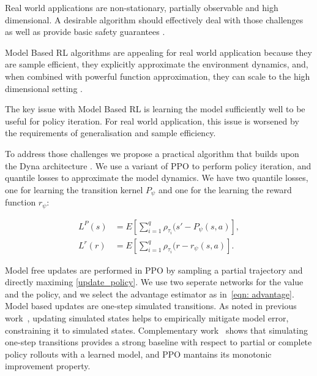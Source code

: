 \documentclass{article}
\begin{document}
        Real world applications are non-stationary, partially observable and high dimensional. A desirable algorithm should effectively deal with those challenges as well as provide basic safety guarantees \cite{dulac2019challenges}.
        
        Model Based RL algorithms are appealing for real world application because they are sample efficient, they explicitly approximate the environment dynamics, and, when combined with powerful function approximation, they can scale to the high dimensional setting \cite{nagabandi2018neural}.
        
        The key issue with Model Based RL is learning the model sufficiently well to be useful for policy iteration. For real world application, this issue is worsened by the requirements of generalisation and sample efficiency.
        
        To address those challenges we propose a practical algorithm that builds upon the Dyna architecture \cite{sutton2012dyna}.
        We use a variant of PPO \cite{Schulman2017} to perform policy iteration, and quantile losses to approximate the model dynamics. We have two quantile losses, one for learning the transition kernel $P_\psi$ and one for the learning the reward function $r_\psi$:

        
        \begin{align}
        	L^P(s) &= E[\sum_{i=1}^q \rho_{\tau_i}(s' - P_\psi(s,a)], \\
        	L^r(r) &= E[\sum_{i=1}^q \rho_{\tau_i}(r - r_\psi(s,a)].
        \end{align}
        
        Model free updates are performed in PPO by sampling a partial trajectory and directly maximing {\eqref{update_policy}}. %
        We use two seperate networks for the value and the policy, and we select the advantage estimator as in~\eqref{eqn: advantage}. Model based updates are one-step simulated transitions. As noted in previous work~\cite{van2019use}, updating simulated states helps to empirically mitigate model error, constraining it to simulated states. Complementary work~\cite{janner2019trust} shows that simulating one-step transitions provides a strong baseline with respect to partial or complete policy rollouts with a learned model, and PPO mantains its monotonic improvement property.
        
\end{document}
